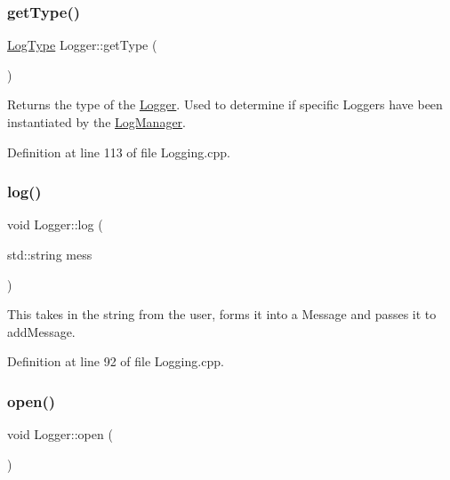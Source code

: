 \subsubsection{\texorpdfstring{getType()}{getType()}}
{\footnotesize\ttfamily \mbox{\hyperlink{namespace_world_architect_adf13e54f2c38346ed9d5013cff07fc8e}{Log\+Type}} Logger\+::get\+Type (\begin{DoxyParamCaption}{ }\end{DoxyParamCaption})}



Returns the type of the \mbox{\hyperlink{class_world_architect_1_1_logger}{Logger}}. Used to determine if specific Loggers have been instantiated by the \mbox{\hyperlink{class_world_architect_1_1_log_manager}{Log\+Manager}}. 



Definition at line 113 of file Logging.\+cpp.

\mbox{\label{class_world_architect_1_1_logger_a64e7c69902bcf71209f43b2c67d6a169}} 
\subsubsection{\texorpdfstring{log()}{log()}}
{\footnotesize\ttfamily void Logger\+::log (\begin{DoxyParamCaption}\item[{std\+::string}]{mess }\end{DoxyParamCaption})}



This takes in the string from the user, forms it into a Message and passes it to add\+Message. 



Definition at line 92 of file Logging.\+cpp.

\mbox{\label{class_world_architect_1_1_logger_a751cd1a942f2bfce73ec61feaa439d22}} 
\subsubsection{\texorpdfstring{open()}{open()}}
{\footnotesize\ttfamily void Logger\+::open (\begin{DoxyParamCaption}{ }\end{DoxyParamCaption})}



